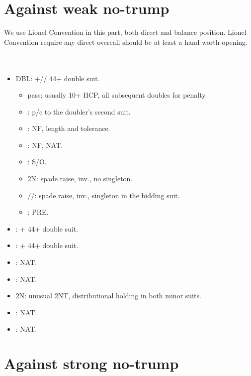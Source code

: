 \documentclass[12pt,twoside,a5paper]{report}%
\begin{document}
	\section*{Against weak no-trump}
		We use Lionel Convention in this part, both direct and balance position. Lionel Convention require any direct overcall should be at least a hand worth opening.\\
		\\
		\\
		\begin{itemize}
		\renewcommand{\labelitemi}{--}
			\item DBL: \sp{}+\he{}/\di{}/\cl{} 44+ double suit.
				\begin{itemize}
				\renewcommand{\labelitemi}{--}
					\item pass: usually 10+ HCP, all subsequent doubles for penalty.
					\item {}: p/c to the doubler's second suit.
					\item {}: NF, \di{} length and \he{} tolerance.
					\item {}: NF, NAT.
					\item {}: S/O.
					\item 2N: spade raise, inv., no singleton.
					\item {}/\di{}/\he{}: spade raise, inv., singleton in the bidding suit.
					\item {}: PRE.
				\end{itemize}
			\item {}: \he{}+\cl{} 44+ double suit.
			\item {}: \he{}+\di{} 44+ double suit.
			\item {}: NAT.
			\item {}: NAT.
			\item 2N: unusual 2NT, distributional holding in both minor suits.
			\item {}: NAT.
			\item {}: NAT.
		\end{itemize}
		
	\section*{Against strong no-trump}
\end{document}
